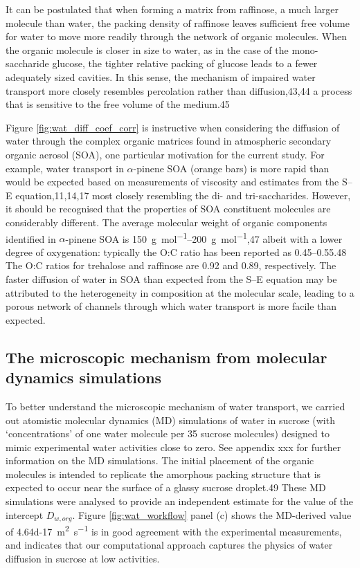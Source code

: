 It can be postulated that when forming a matrix from raffinose, a much larger molecule than water, the packing density of raffinose leaves sufficient free volume for water to move more readily through the network of organic molecules. When the organic molecule is closer in size to water, as in the case of the mono-saccharide glucose, the tighter relative packing of glucose leads to a fewer adequately sized cavities. In this sense, the mechanism of impaired water transport more closely resembles percolation rather than diffusion,43,44 a process that is sensitive to the free volume of the medium.45

Figure \ref{fig:wat_diff_coef_corr} is instructive when considering the diffusion of water through the complex organic matrices found in atmospheric secondary organic aerosol (SOA), one particular motivation for the current study. For example, water transport in $\alpha$-pinene SOA (orange bars) is more rapid than would be expected based on measurements of viscosity and estimates from the S–E equation,11,14,17 most closely resembling the di- and tri-saccharides. However, it should be recognised that the properties of SOA constituent molecules are considerably different. The average molecular weight of organic components identified in $\alpha$-pinene SOA is \SIrange{150}{200}{\gram\per\mole},47 albeit with a lower degree of oxygenation: typically the O:C ratio has been reported as \numrange{0.45}{0.55}.48 The O:C ratios for trehalose and raffinose are \num{0.92} and \num{0.89}, respectively. The faster diffusion of water in SOA than expected from the S–E equation may be attributed to the heterogeneity in composition at the molecular scale, leading to a porous network of channels through which water transport is more facile than expected.

\subsection{The microscopic mechanism from molecular dynamics simulations}

To better understand the microscopic mechanism of water transport, we carried out atomistic molecular dynamics (MD) simulations of water in sucrose (with ‘concentrations’ of one water molecule per \num{35} sucrose molecules) designed to mimic experimental water activities close to zero. See appendix xxx for further information on the MD simulations. The initial placement of the organic molecules is intended to replicate the amorphous packing structure that is expected to occur near the surface of a glassy sucrose droplet.49 These MD simulations were analysed to provide an independent estimate for the value of the intercept $D_{w,org}$. Figure \ref{fig:wat_workflow} panel (c) shows the MD-derived value of \SI{4.64d-17}{\meter\squared\per\second} is in good agreement with the experimental measurements, and indicates that our computational approach captures the physics of water diffusion in sucrose at low activities.

